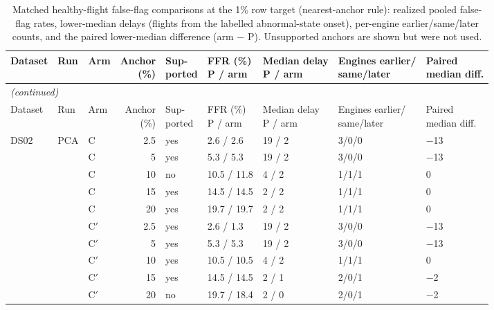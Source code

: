 \begin{scriptsize}
\begin{longtable}{lllrlllll}
\caption{Matched healthy-flight false-flag comparisons at the 1\% row target (nearest-anchor rule): realized pooled false-flag rates, lower-median delays (flights from the labelled abnormal-state onset), per-engine earlier/same/later counts, and the paired lower-median difference (arm $-$ P). Unsupported anchors are shown but were not used.}\label{tab:s13_matched}\\
\toprule
Dataset & Run & Arm & \makecell{Anchor\\(\%)} & \makecell{Sup-\\ported} & \makecell{FFR (\%)\\P / arm} & \makecell{Median delay\\P / arm} & \makecell{Engines earlier/\\same/later} & \makecell{Paired\\median diff.} \\
\midrule
\endfirsthead
\multicolumn{9}{l}{\emph{(continued)}}\\
\toprule
Dataset & Run & Arm & \makecell{Anchor\\(\%)} & \makecell{Sup-\\ported} & \makecell{FFR (\%)\\P / arm} & \makecell{Median delay\\P / arm} & \makecell{Engines earlier/\\same/later} & \makecell{Paired\\median diff.} \\
\midrule
\endhead
\bottomrule
\endfoot
DS02 & PCA & C & 2.5 & yes & 2.6 / 2.6 & 19 / 2 & 3/0/0 & $-$13 \\
 &  & C & 5 & yes & 5.3 / 5.3 & 19 / 2 & 3/0/0 & $-$13 \\
 &  & C & 10 & no & 10.5 / 11.8 & 4 / 2 & 1/1/1 & 0 \\
 &  & C & 15 & yes & 14.5 / 14.5 & 2 / 2 & 1/1/1 & 0 \\
 &  & C & 20 & yes & 19.7 / 19.7 & 2 / 2 & 1/1/1 & 0 \\
 &  & C$'$ & 2.5 & yes & 2.6 / 1.3 & 19 / 2 & 3/0/0 & $-$13 \\
 &  & C$'$ & 5 & yes & 5.3 / 5.3 & 19 / 2 & 3/0/0 & $-$13 \\
 &  & C$'$ & 10 & yes & 10.5 / 10.5 & 4 / 2 & 1/1/1 & 0 \\
 &  & C$'$ & 15 & yes & 14.5 / 14.5 & 2 / 1 & 2/0/1 & $-$2 \\
 &  & C$'$ & 20 & no & 19.7 / 18.4 & 2 / 0 & 2/0/1 & $-$2 \\

\end{longtable}
\end{scriptsize}
